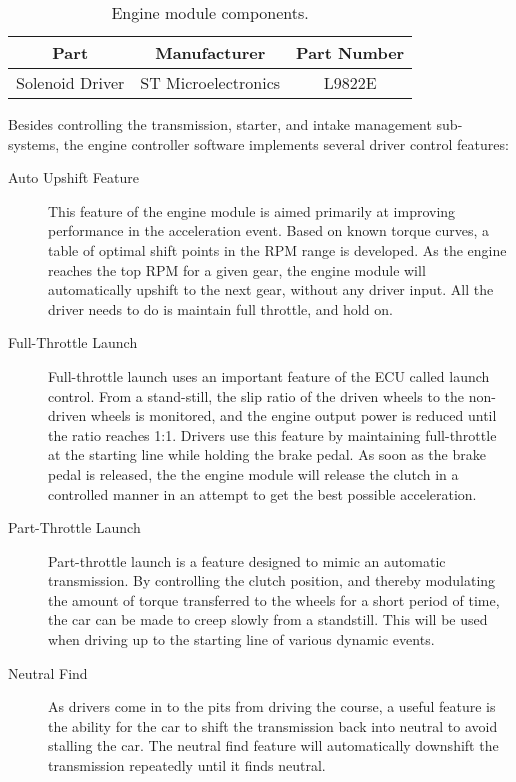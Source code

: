 \begin{table}[H]
	\caption{Engine module components.}
	\label{table:engine_module_components}
	\centering
	\begin{tabular}{|c|c|c|}
		\hline 
		Part & Manufacturer & Part Number\tabularnewline 
		\hline \hline
		Solenoid Driver & ST Microelectronics & L9822E\tabularnewline \hline
		\hline
	\end{tabular}
\end{table}

Besides controlling the transmission, starter, and intake management sub-systems, the engine controller software implements several driver control features:

\begin{description}

\item[Auto Upshift Feature]

This feature of the engine module is aimed primarily at improving performance in the acceleration event. Based on known torque curves, a table of optimal shift points in the RPM range is developed. As the engine reaches the top RPM for a given gear, the engine module will automatically upshift to the next gear, without any driver input. All the driver needs to do is maintain full throttle, and hold on.

\item[Full-Throttle Launch]
Full-throttle launch uses an important feature of the ECU called launch control. From a stand-still, the slip ratio of the driven wheels to the non-driven wheels is monitored, and the engine output power is reduced until the ratio reaches 1:1. Drivers use this feature by maintaining full-throttle at the starting line while holding the brake pedal. As soon as the brake pedal is released, the the engine module will release the clutch in a controlled manner in an attempt to get the best possible acceleration.

\item[Part-Throttle Launch]
Part-throttle launch is a feature designed to mimic an automatic transmission. By controlling the clutch position, and thereby modulating the amount of torque transferred to the wheels for a short period of time, the car can be made to creep slowly from a standstill. This will be used when driving up to the starting line of various dynamic events.

\item[Neutral Find]
As drivers come in to the pits from driving the course, a useful feature is the ability for the car to shift the transmission back into neutral to avoid stalling the car. The neutral find feature will automatically downshift the transmission repeatedly until it finds neutral.

\end{description}

